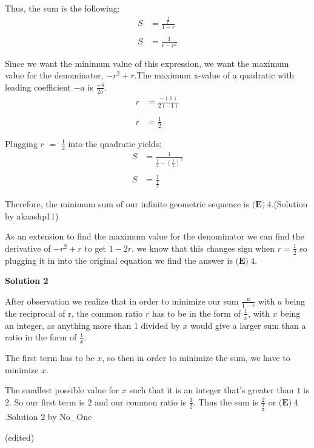 \begin{enumerate}
 Thus, the sum is the following:
 \[\begin{split} S & = \frac{\frac{1}{r}}{1-r} \\\\ S & =\frac{1}{r-r^2} \end{split}\]

 Since we want the minimum value of this expression, we want the maximum value for the denominator, $-r^2+r$.The maximum x-value of a quadratic with leading coefficient $-a$ is $\frac{-b}{2a}$.
 \[\begin{split} r & = \frac{-(1)}{2(-1)} \\\\ r & = \frac{1}{2}  \end{split}\]

 Plugging $r$ $=$ $\frac{1}{2}$ into the quadratic yields:
 \[\begin{split} S & = \frac{1}{\frac{1}{2} -\left(\frac{1}{2}\right)^2} \\\\ S & = \frac{1}{\frac{1}{4}}  \end{split}\]

 Therefore, the minimum sum of our infinite geometric sequence is $\boxed{\textbf{(E)}\ 4}$.(Solution by akaashp11)

 As an extension to find the maximum value for the denominator we can find the derivative of $-r^2+r$ to get $1-2r$. we know that this changes sign when $r = \frac{1}{2}$ so plugging it in into the original equation we find the answer is $\boxed{\textbf{(E)}\ 4}$.

 



\textbf{Solution 2}

After observation we realize that in order to minimize our sum $\frac{a}{1-r}$ with $a$ being the reciprocal of r, the common ratio $r$ has to be in the form of $\frac{1}{x}$, with $x$ being an integer, as anything more than $1$ divided by $x$ would give a larger sum than a ratio in the form of $\frac{1}{x}$. 

 The first term has to be $x$, so then in order to minimize the sum, we have to minimize $x$. 

 The smallest possible value for $x$ such that it is an integer that's greater than $1$ is $2$. So our first term is $2$ and our common ratio is $\frac{1}{2}$. Thus the sum is $\frac{2}{\frac {1}{2}}$ or $\boxed{\textbf{(E)}\ 4}$.Solution 2 by No\_One

 (edited)


\end{enumerate}
